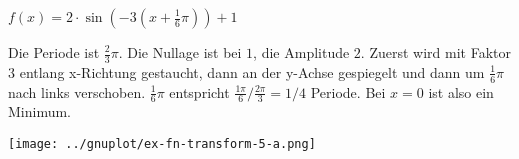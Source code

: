 \item $f(x) = 2\cdot\sin\left(-3(x+\frac{1}{6}\pi)\right)+1$

Die Periode ist $\frac{2}{3}\pi$. Die Nullage ist bei $1$, die Amplitude $2$. Zuerst wird mit Faktor $3$ entlang x-Richtung gestaucht, dann an der y-Achse gespiegelt und dann um $\frac{1}{6}\pi$ nach links verschoben. $\frac{1}{6}\pi$ entspricht $\frac{1\pi}{6} / \frac{2\pi}{3} = 1/4$ Periode. Bei $x=0$ ist also ein Minimum.

\begin{center}
  \texttt{[image: ../gnuplot/ex-fn-transform-5-a.png]}
\end{center}

